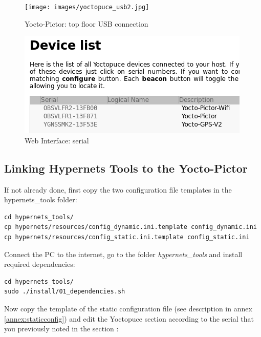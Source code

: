 \begin{figure}[!ht]
  \centering
  \begin{minipage}[b]{0.35\textwidth}
	\texttt{[image: images/yoctopuce\_usb2.jpg]}
	  \vspace{11pt}
	\caption{Yocto-Pictor: top floor USB connection}
	\label{fig:yoctoUSBtop}
  \end{minipage}
  \hfill
  \begin{minipage}[b]{0.55\textwidth}
	  \includegraphics[width=\linewidth]{images/yocto3.png}
	\caption{Web Interface: serial}
	\label{fig:yoctoSerial}
  \end{minipage}
\end{figure}

\subsection{Linking Hypernets Tools to the Yocto-Pictor}

\label{sec:yocto-config}
If not already done, first copy the two configuration file templates in 
the hypernets\_tools folder:

\begin{lstlisting}
cd hypernets_tools/
cp hypernets/resources/config_dynamic.ini.template config_dynamic.ini
cp hypernets/resources/config_static.ini.template config_static.ini
\end{lstlisting}

Connect the PC to the internet, go to the folder \emph{hypernets\_tools} and 
install required dependencies:

\begin{lstlisting}
cd hypernets_tools/
sudo ./install/01_dependencies.sh
\end{lstlisting}

Now copy the template of the static configuration file 
(see description in annex \ref{annex:staticconfig}) and edit the Yoctopuce
section according to the serial that you previously noted in the section 
\pageref{sec:yocto-wifi}:

